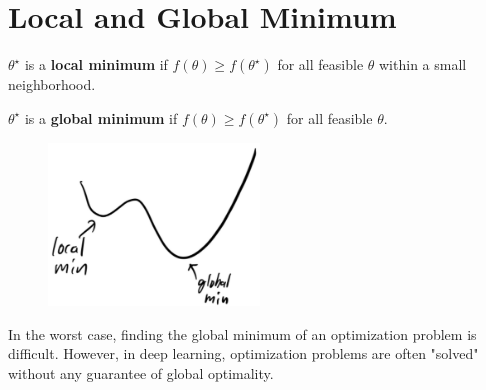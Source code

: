 \section{Local and Global Minimum}

\begin{definition}
    $\theta^{\star}$ is a \textbf{local minimum} if $f(\theta) \geq f\left(\theta^{\star}\right)$ for all feasible $\theta$ within a small neighborhood.

    $\theta^{\star}$ is a \textbf{global minimum} if $f(\theta) \geq f\left(\theta^{\star}\right)$ for all feasible $\theta$.

    \begin{figure}[H]
        \centering
        \includegraphics[width=0.5\textwidth]{.././assets/1.1.jpg}
    \end{figure}

    In the worst case, finding the global minimum of an optimization problem is difficult.
    However, in deep learning, optimization problems are often "solved" without any guarantee of global optimality.
\end{definition}

